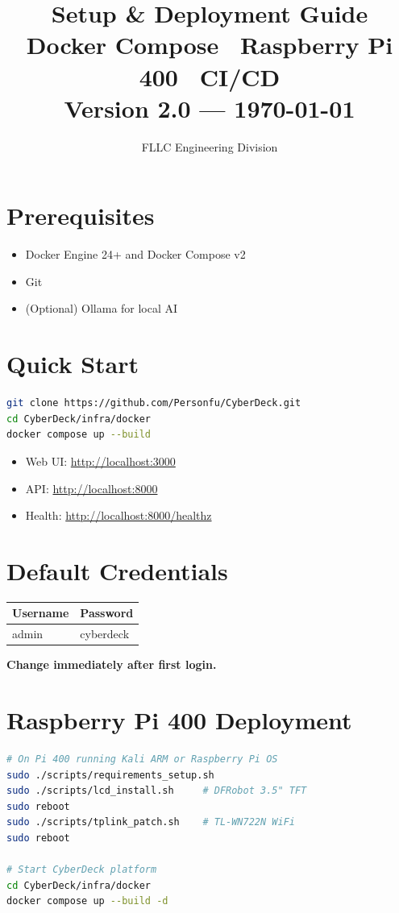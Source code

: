 \documentclass[11pt,a4paper]{article}
\title{%
  {\Huge\bfseries\textcolor{cyber}{Setup \& Deployment Guide}}\\[6pt]
  {\Large Docker Compose \textbullet\ Raspberry Pi 400 \textbullet\ CI/CD}\\[4pt]
  {\normalsize Version 2.0 --- \today}
}
\author{FLLC Engineering Division}
\date{}
\begin{document}
\maketitle\thispagestyle{fancy}
\tableofcontents\newpage

\section{Prerequisites}
\begin{itemize}
  \item Docker Engine 24+ and Docker Compose v2
  \item Git
  \item (Optional) Ollama for local AI
\end{itemize}

\section{Quick Start}
\begin{lstlisting}[language=bash]
git clone https://github.com/Personfu/CyberDeck.git
cd CyberDeck/infra/docker
docker compose up --build
\end{lstlisting}
\begin{itemize}
  \item Web UI: \url{http://localhost:3000}
  \item API: \url{http://localhost:8000}
  \item Health: \url{http://localhost:8000/healthz}
\end{itemize}

\section{Default Credentials}
\begin{tabular}{ll}
\toprule
\textbf{Username} & \textbf{Password} \\
\midrule
admin & cyberdeck \\
\bottomrule
\end{tabular}

\textbf{Change immediately after first login.}

\section{Raspberry Pi 400 Deployment}
\begin{lstlisting}[language=bash]
# On Pi 400 running Kali ARM or Raspberry Pi OS
sudo ./scripts/requirements_setup.sh
sudo ./scripts/lcd_install.sh     # DFRobot 3.5" TFT
sudo reboot
sudo ./scripts/tplink_patch.sh    # TL-WN722N WiFi
sudo reboot

# Start CyberDeck platform
cd CyberDeck/infra/docker
docker compose up --build -d
\end{lstlisting}
\end{document}
